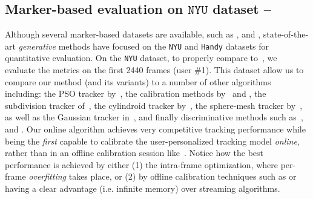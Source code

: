 
\subsection{Marker-based evaluation on $\texttt{NYU}$ dataset --
}
\label{sec:evalstar}
Although several marker-based datasets are available, such as \cite{qian2014realtime}, \cite{sharp2015accurate} and \cite{yuan2017bighand}, state-of-the-art \emph{generative} methods have focused on the \texttt{NYU} \cite{tompson2014real} and \texttt{Handy} \cite{tkach2016sphere} datasets for quantitative evaluation. 
On the \texttt{NYU} dataset, to properly compare to~\cite{taylor2016joint}, we evaluate the metrics on the first 2440 frames (user \#1). 
This dataset allow us to compare our method (and its variants) to a number of other algorithms including: the PSO tracker by~\cite{sharp2015accurate}, the calibration methods by~\cite{khamis2015learning} and \cite{tan2016fits}, the subdivision tracker of~\cite{taylor2016joint}, the cylindroid tracker by~\cite{htrack}, the sphere-mesh tracker by~\cite{tkach2016sphere}, as well as the Gaussian tracker in~\cite{sridhar2015fast}, and finally discriminative methods such as~\cite{tompson2014real}, \cite{tang2015opening} and \cite{oberweger2015hands}. 
% 
% 
Our online algorithm achieves very competitive tracking performance while being the \emph{first} capable to calibrate the user-personalized tracking model \emph{online}, rather than in an offline calibration session like~\cite{taylor2016joint}. 
% 
Notice how the best performance is achieved by either (1) the intra-frame optimization, where per-frame \emph{overfitting} takes place, or (2) by offline calibration techniques such as \OfflineSoft{} or \cite{taylor2016joint} having a clear advantage (i.e. infinite memory) over streaming algorithms. 



